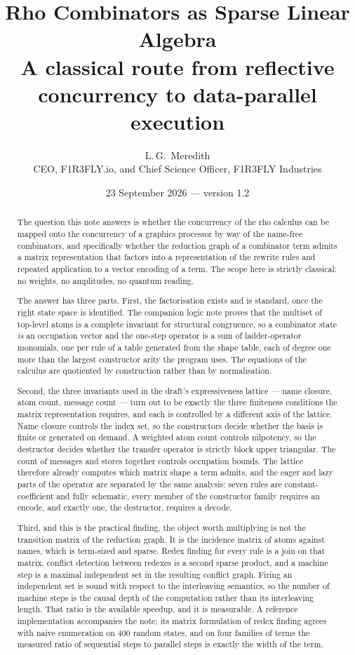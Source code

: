 \documentclass[11pt,a4paper]{article}
\title{\textbf{Rho Combinators as Sparse Linear Algebra}\\[4pt]
\large A classical route from reflective concurrency to data-parallel execution}
\author{L.\,G.\ Meredith\\
\small CEO, F1R3FLY.io, and Chief Science Officer, F1R3FLY Industries}
\date{23 September 2026 --- version 1.2}
\theoremstyle{plain}
\theoremstyle{definition}
\theoremstyle{remark}
\newcommand{\rhoc}{\textsf{rho}}
\begin{document}
\maketitle

\begin{abstract}
\noindent
The question this note answers is whether the concurrency of the \rhoc{}
calculus can be mapped onto the concurrency of a graphics processor by way of
the name-free combinators, and specifically whether the reduction graph of a
combinator term admits a matrix representation that factors into a
representation of the rewrite rules and repeated application to a vector
encoding of a term. The scope here is strictly classical: no weights, no
amplitudes, no quantum reading.

The answer has three parts. First, the factorisation exists and is standard,
once the right state space is identified. The companion logic note proves
that the multiset of top-level atoms is a complete invariant for structural
congruence, so a combinator state \emph{is} an occupation vector and the one-step
operator is a sum of ladder-operator monomials, one per rule of a table
generated from the shape table, each of degree one more than the largest
constructor arity the program uses. The equations of the calculus are quotiented by construction
rather than by normalisation.

Second, the three invariants used in the draft's expressiveness lattice ---
name closure, atom count, message count --- turn out to be exactly the three
finiteness conditions the matrix representation requires, and each is
controlled by a different axis of the lattice. Name closure controls the index
set, so the constructors decide whether the basis is finite or generated on
demand. A weighted atom count controls nilpotency, so the destructor decides
whether the transfer operator is strictly block upper triangular. The count of
messages and stores together controls occupation bounds. The lattice therefore already computes which matrix shape a
term admits, and the eager and lazy parts of the operator are separated by the
same analysis: seven rules are constant-coefficient and fully schematic,
every member of the constructor family requires an encode, and exactly one,
the destructor, requires a decode.

Third, and this is the practical finding, the object worth multiplying is not
the transition matrix of the reduction graph. It is the incidence matrix of
atoms against names, which is term-sized and sparse. Redex finding for every
rule is a join on that matrix, conflict detection between redexes is a second
sparse product, and a machine step is a maximal independent set in the
resulting conflict graph. Firing an independent set is sound with respect to
the interleaving semantics, so the number of machine steps is the causal
depth of the computation rather than its interleaving length. That ratio is
the available speedup, and it is measurable. A reference implementation
accompanies the note; its matrix formulation of redex finding agrees with
naive enumeration on 400 random states, and on four families of terms the
measured ratio of sequential steps to parallel steps is exactly the width of
the term.


\end{abstract}
\end{document}

